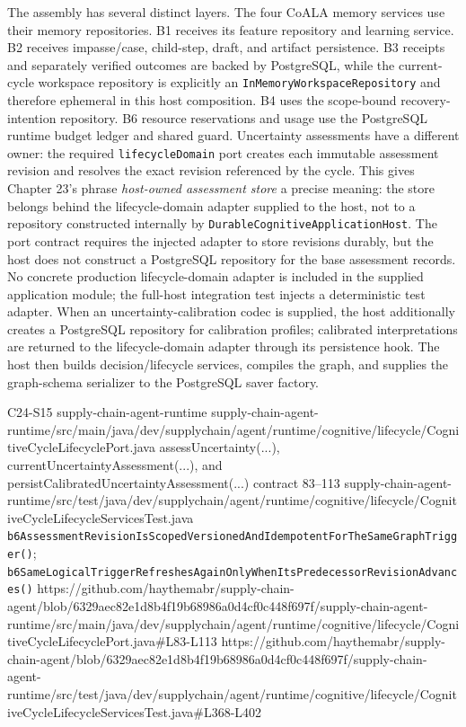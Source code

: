 The assembly has several distinct layers. The four CoALA memory services use their memory repositories. B1 receives its feature repository and learning service. B2 receives impasse/case, child-step, draft, and artifact persistence. B3 receipts and separately verified outcomes are backed by PostgreSQL, while the current-cycle workspace repository is explicitly an \texttt{InMemoryWorkspaceRepository} and therefore ephemeral in this host composition. B4 uses the scope-bound recovery-intention repository. B6 resource reservations and usage use the PostgreSQL runtime budget ledger and shared guard. Uncertainty assessments have a different owner: the required \texttt{lifecycleDomain} port creates each immutable assessment revision and resolves the exact revision referenced by the cycle. This gives Chapter 23's phrase \emph{host-owned assessment store} a precise meaning: the store belongs behind the lifecycle-domain adapter supplied to the host, not to a repository constructed internally by \texttt{DurableCognitive\allowbreak{}ApplicationHost}. The port contract requires the injected adapter to store revisions durably, but the host does not construct a PostgreSQL repository for the base assessment records. No concrete production lifecycle-domain adapter is included in the supplied application module; the full-host integration test injects a deterministic test adapter. When an uncertainty-calibration codec is supplied, the host additionally creates a PostgreSQL repository for calibration profiles; calibrated interpretations are returned to the lifecycle-domain adapter through its persistence hook. The host then builds decision/lifecycle services, compiles the graph, and supplies the graph-schema serializer to the PostgreSQL saver factory.

\BookSourceReferenceNoQR
  {C24-S15}
  {supply-chain-agent-runtime}
  {supply-chain-agent-runtime/src/main/java/dev/supplychain/agent/runtime/cognitive/lifecycle/CognitiveCycleLifecyclePort.java}
  {assessUncertainty(...), currentUncertaintyAssessment(...), and persistCalibratedUncertaintyAssessment(...) contract}
  {83--113}
  {supply-chain-agent-runtime/src/test/java/dev/supplychain/agent/runtime/cognitive/lifecycle/CognitiveCycleLifecycleServicesTest.java}
  {\texttt{b6AssessmentRevisionIsScopedVersionedAndIdempotentForTheSameGraphTrigger()}; \texttt{b6SameLogicalTriggerRefreshesAgainOnlyWhenItsPredecessorRevisionAdvances()}}
  {https://github.com/haythemabr/supply-chain-agent/blob/6329aec82e1d8b4f19b68986a0d4cf0c448f697f/supply-chain-agent-runtime/src/main/java/dev/supplychain/agent/runtime/cognitive/lifecycle/CognitiveCycleLifecyclePort.java\#L83-L113}
  {https://github.com/haythemabr/supply-chain-agent/blob/6329aec82e1d8b4f19b68986a0d4cf0c448f697f/supply-chain-agent-runtime/src/test/java/dev/supplychain/agent/runtime/cognitive/lifecycle/CognitiveCycleLifecycleServicesTest.java\#L368-L402}

